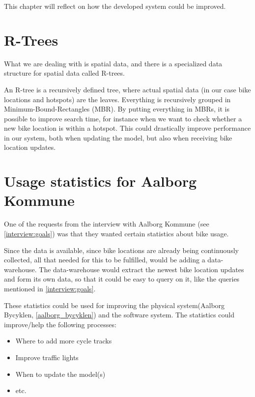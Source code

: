 This chapter will reflect on how the developed system could be improved.

\section{R-Trees}
What we are dealing with is spatial data, and there is a specialized data structure for spatial data called R-trees.\cite[Section 25.3.5.3]{database_system_concepts}

An R-tree is a recursively defined tree, where actual spatial data (in our case bike locations and hotspots) are the leaves.
Everything is recursively grouped in Minimum-Bound-Rectangles (MBR).
By putting everything in MBRs, it is possible to improve search time, for instance when we want to check whether a new bike location is within a hotspot.
This could drastically improve performance in our system, both when updating the model, but also when receiving bike location updates.

\section{Usage statistics for Aalborg Kommune}
One of the requests from the interview with Aalborg Kommune (see \cref{interview:goals}) was that they wanted certain statistics about bike usage.

Since the data is available, since bike locations are already being continuously collected, all that needed for this to be fulfilled, would be adding a data-warehouse.
The data-warehouse would extract the newest bike location updates and form its own data, so that it could be easy to query on it, like the queries mentioned in \cref{interview:goals}.

These statistics could be used for improving the physical system(Aalborg Bycyklen, \cref{aalborg_bycyklen}) and the software system.
The statistics could improve/help the following processes:
\begin{itemize}
\item Where to add more cycle tracks
\item Improve traffic lights
\item When to update the model(s)
\item etc.
\end{itemize}

